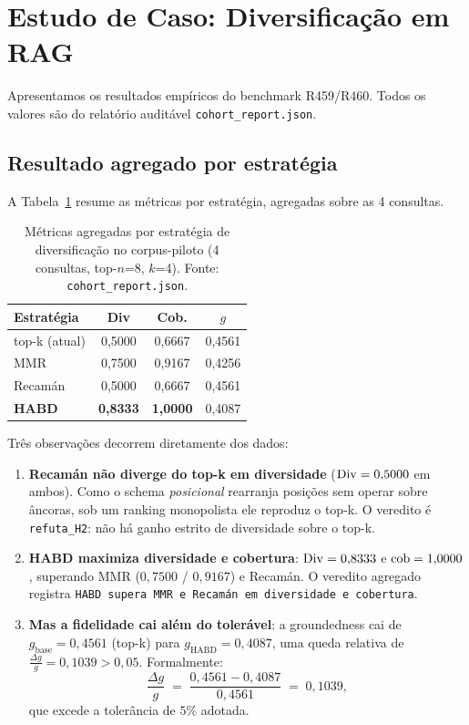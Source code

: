 \section{Estudo de Caso: Diversificação em RAG}\label{sec:caso}

Apresentamos os resultados empíricos do benchmark R459/R460. Todos os valores
são do relatório auditável \texttt{cohort\_report.json}.

\subsection{Resultado agregado por estratégia}

A Tabela~\ref{tab:result} resume as métricas por estratégia, agregadas sobre as
4 consultas.

\begin{table}[h]
\centering
\small
\caption{Métricas agregadas por estratégia de diversificação no corpus-piloto
(4 consultas, top-$n$=8, $k$=4). Fonte: \texttt{cohort\_report.json}.}
\label{tab:result}
\begin{tabular}{lccc}
\toprule
\textbf{Estratégia} & \textbf{Div} & \textbf{Cob.} & \textbf{$g$} \\
\midrule
top-k (atual) & 0{,}5000 & 0{,}6667 & 0{,}4561 \\
MMR          & 0{,}7500 & 0{,}9167 & 0{,}4256 \\
Recamán      & 0{,}5000 & 0{,}6667 & 0{,}4561 \\
\textbf{HABD} & \textbf{0{,}8333} & \textbf{1{,}0000} & 0{,}4087 \\
\bottomrule
\end{tabular}
\end{table}

Três observações decorrem diretamente dos dados:

\begin{enumerate}
  \item \textbf{Recamán não diverge do top-k em diversidade} ($\mathrm{Div} = 0{,}5000$
        em ambos). Como o schema \emph{posicional} rearranja posições sem operar
        sobre âncoras, sob um ranking monopolista ele reproduz o top-k. O veredito
        é \texttt{refuta\_H2}: não há ganho estrito de diversidade sobre o
        top-k.
  \item \textbf{HABD maximiza diversidade e cobertura}: $\mathrm{Div} = 0{,}8333$ e
        $\mathrm{cob} = 1{,}0000$, superando MMR ($0{,}7500$ / $0{,}9167$) e Recamán. O
        veredito agregado registra \texttt{HABD supera MMR e Recamán em
        diversidade e cobertura}.
  \item \textbf{Mas a fidelidade cai além do tolerável}: a groundedness cai de
        $g_{\mathrm{base}} = 0{,}4561$ (top-k) para $g_{\mathrm{HABD}} =
        0{,}4087$, uma queda relativa de
        $\tfrac{\Delta g}{g} = 0{,}1039 > 0{,}05$. Formalmente:
        \[
        \frac{\Delta g}{g} \;=\;
        \frac{0{,}4561 - 0{,}4087}{0{,}4561} \;=\; 0{,}1039,
        \]
        que excede a tolerância de $5\%$ adotada.
\end{enumerate}

